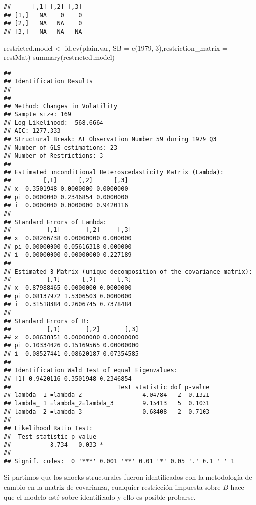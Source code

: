 \documentclass[
]{book}
\newenvironment{Shaded}{\begin{snugshade}}{\end{snugshade}}
\newcommand{\AttributeTok}[1]{\textcolor[rgb]{0.77,0.63,0.00}{#1}}
\newcommand{\DecValTok}[1]{\textcolor[rgb]{0.00,0.00,0.81}{#1}}
\newcommand{\FunctionTok}[1]{\textcolor[rgb]{0.00,0.00,0.00}{#1}}
\newcommand{\NormalTok}[1]{#1}
\newcommand{\OtherTok}[1]{\textcolor[rgb]{0.56,0.35,0.01}{#1}}
\begin{document}
\begin{verbatim}
##      [,1] [,2] [,3]
## [1,]   NA    0    0
## [2,]   NA   NA    0
## [3,]   NA   NA   NA
\end{verbatim}

\begin{Shaded}
\begin{Highlighting}[]
\NormalTok{restricted.model }\OtherTok{\textless{}{-}} \FunctionTok{id.cv}\NormalTok{(plain.var, }\AttributeTok{SB =} \FunctionTok{c}\NormalTok{(}\DecValTok{1979}\NormalTok{, }\DecValTok{3}\NormalTok{),}\AttributeTok{restriction\_matrix =}\NormalTok{ restMat)}
\FunctionTok{summary}\NormalTok{(restricted.model)}
\end{Highlighting}
\end{Shaded}

\begin{verbatim}
## 
## Identification Results
## ---------------------- 
## 
## Method: Changes in Volatility
## Sample size: 169
## Log-Likelihood: -568.6664
## AIC: 1277.333
## Structural Break: At Observation Number 59 during 1979 Q3
## Number of GLS estimations: 23
## Number of Restrictions: 3
## 
## Estimated unconditional Heteroscedasticity Matrix (Lambda):
##         [,1]      [,2]      [,3]
## x  0.3501948 0.0000000 0.0000000
## pi 0.0000000 0.2346854 0.0000000
## i  0.0000000 0.0000000 0.9420116
## 
## Standard Errors of Lambda:
##          [,1]       [,2]     [,3]
## x  0.08266738 0.00000000 0.000000
## pi 0.00000000 0.05616318 0.000000
## i  0.00000000 0.00000000 0.227189
## 
## Estimated B Matrix (unique decomposition of the covariance matrix): 
##          [,1]      [,2]      [,3]
## x  0.87988465 0.0000000 0.0000000
## pi 0.08137972 1.5306503 0.0000000
## i  0.31518384 0.2606745 0.7378484
## 
## Standard Errors of B:
##          [,1]       [,2]       [,3]
## x  0.08638851 0.00000000 0.00000000
## pi 0.10334026 0.15169565 0.00000000
## i  0.08527441 0.08620187 0.07354585
## 
## Identification Wald Test of equal Eigenvalues:
## [1] 0.9420116 0.3501948 0.2346854
##                              Test statistic dof p-value
## lambda_ 1 =lambda_2                 4.04784   2  0.1321
## lambda_ 1 =lambda_2=lambda_3        9.15413   5  0.1031
## lambda_ 2 =lambda_3                 0.68408   2  0.7103
## 
## Likelihood Ratio Test: 
##  Test statistic p-value  
##           8.734   0.033 *
## ---
## Signif. codes:  0 '***' 0.001 '**' 0.01 '*' 0.05 '.' 0.1 ' ' 1
\end{verbatim}

Si partimos que los shocks structurales fueron identificados con la metodología de cambio en la matriz de covarianza, cualquier restricción impuesta sobre \(B\) hace que el modelo esté sobre identificado y ello es posible probarse.
\end{document}
